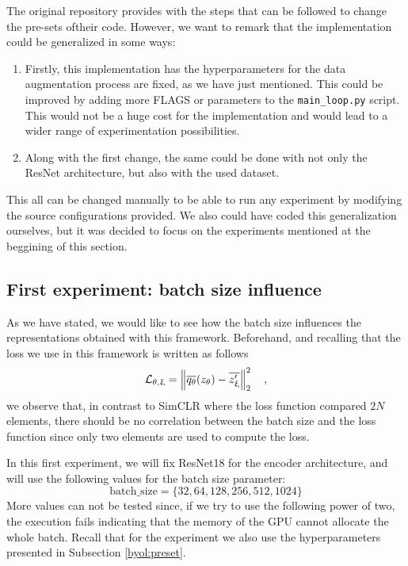 The original repository provides with the steps that can be followed to change the pre-sets oftheir code. However, we want to remark that the implementation could be generalized in some ways:
\begin{enumerate}
\item Firstly, this implementation has the hyperparameters for the data augmentation process are fixed, as we have just mentioned. This could be improved by adding more FLAGS or parameters to the \lstinline{main_loop.py} script. This would not be a huge cost for the implementation and would lead to a wider range of experimentation possibilities.

\item Along with the first change, the same could be done with not only the ResNet architecture, but also with the used dataset.
\end{enumerate}

This all can be changed manually to be able to run any experiment by modifying the source configurations provided. We also could have coded this generalization ourselves, but it was decided to focus on the experiments mentioned at the beggining of this section.

\subsection{First experiment: batch size influence}
\label{experiments:byol:first}

As we have stated, we would like to see how the batch size influences the representations obtained with this framework.  Beforehand, and recalling that the loss we use in this framework is written as follows
\[
\mathcal L_{\theta,\upxi} = \left\lVert\overline{q_\theta}(z_\theta) - \overline{z_\upxi'}\right\rVert_2^2\quad , 
\]
we observe that, in contrast to SimCLR where the loss function compared $2N$ elements, there should be no correlation between the batch size and the loss function since only two elements are used to compute the loss. 

In this first experiment, we will fix ResNet18 for the encoder architecture, and will use the following values for the batch size parameter:
\[
\text{batch\_size} = \{32,64,128,256,512,1024\}    
\]
More values can not be tested since, if we try to use the following power of two, the execution fails indicating that the memory of the GPU cannot allocate the whole batch. Recall that for the experiment we also use the hyperparameters presented in Subsection \ref{byol:preset}.

